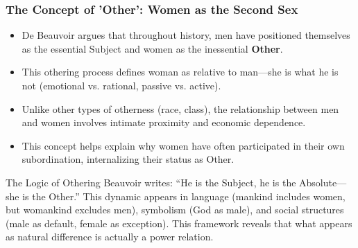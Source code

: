 \documentclass[aspectratio=169]{beamer}
\begin{document}
		\begin{frame}
			\frametitle{The Concept of 'Other': Women as the Second Sex}
			\begin{itemize}
				\item De Beauvoir argues that throughout history, men have positioned themselves as the essential Subject and women as the inessential \textbf{Other}.
				\item This othering process defines woman as relative to man—she is what he is not (emotional vs. rational, passive vs. active).
				\item Unlike other types of otherness (race, class), the relationship between men and women involves intimate proximity and economic dependence.
				\item This concept helps explain why women have often participated in their own subordination, internalizing their status as Other.
			\end{itemize}
			
			\begin{exampleblock}{The Logic of Othering}
				Beauvoir writes: ``He is the Subject, he is the Absolute—she is the Other.'' This dynamic appears in language (mankind includes women, but womankind excludes men), symbolism (God as male), and social structures (male as default, female as exception). This framework reveals that what appears as natural difference is actually a power relation.
			\end{exampleblock}
		\end{frame}
		
\end{document}

